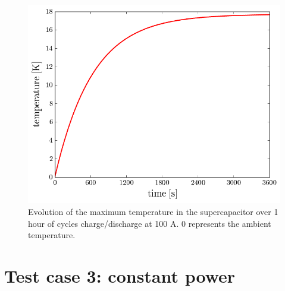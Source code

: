 \documentclass[10pt, oneside]{article}   	%
\begin{document}
\begin{figure}[h!]
    \centering
    \includegraphics[width=\textwidth]{figures/constant_current_cycling_temperature}
    \caption{Evolution of the maximum temperature in the supercapacitor over
1 hour of cycles charge/discharge at 100 A.  0 represents the ambient
temperature.
    }
    \label{fig:constant_current_cycling_temperature}
\end{figure}

\section{Test case 3: constant power}







\end{document}
